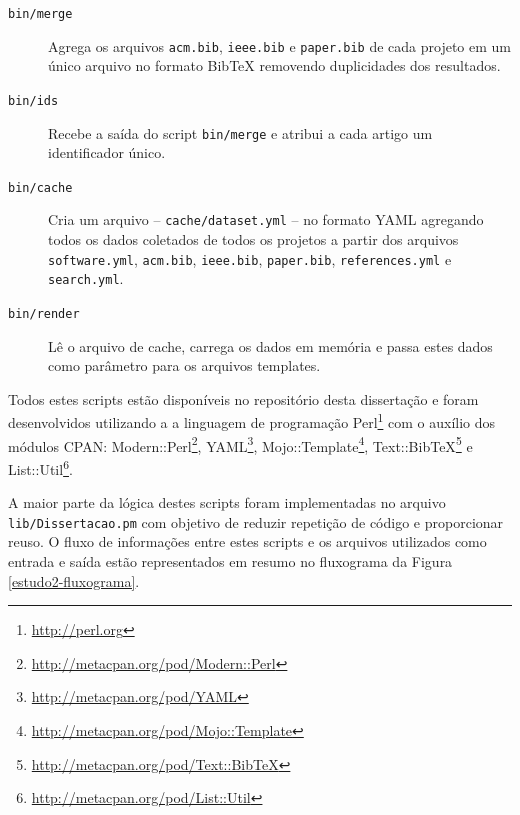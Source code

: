 \begin{description}

  \item[\texttt{bin/merge}]
    Agrega os arquivos \texttt{acm.bib}, \texttt{ieee.bib} e \texttt{paper.bib}
    de cada projeto em um único arquivo no formato BibTeX removendo
    duplicidades dos resultados.

  \item[\texttt{bin/ids}]
    Recebe a saída do script \texttt{bin/merge} e atribui a cada artigo um
    identificador único.

  \item[\texttt{bin/cache}]
    Cria um arquivo -- \texttt{cache/dataset.yml} -- no formato YAML agregando todos os dados coletados de todos
    os projetos a partir dos arquivos \texttt{software.yml}, \texttt{acm.bib},
    \texttt{ieee.bib}, \texttt{paper.bib}, \texttt{references.yml} e
    \texttt{search.yml}.

  \item[\texttt{bin/render}]
    Lê o arquivo de cache, carrega os dados em memória e passa estes dados como
    parâmetro para os arquivos templates.

\end{description}

Todos estes scripts estão disponíveis no repositório desta dissertação e foram desenvolvidos
utilizando a a linguagem de
programação Perl\footnote{\url{http://perl.org}} com o auxílio dos
módulos CPAN: Modern::Perl\footnote{\url{http://metacpan.org/pod/Modern::Perl}},
YAML\footnote{\url{http://metacpan.org/pod/YAML}},
Mojo::Template\footnote{\url{http://metacpan.org/pod/Mojo::Template}},
Text::BibTeX\footnote{\url{http://metacpan.org/pod/Text::BibTeX}} e
List::Util\footnote{\url{http://metacpan.org/pod/List::Util}}.

A maior parte da lógica destes scripts foram implementadas no arquivo
\texttt{lib/Dissertacao.pm} com objetivo de reduzir repetição de código e
proporcionar reuso. O fluxo de informações entre estes scripts e os arquivos
utilizados como entrada e saída estão representados em resumo no fluxograma da
Figura \ref{estudo2-fluxograma}.

